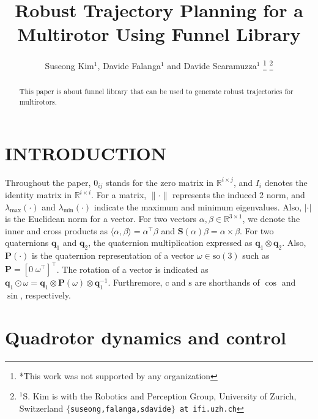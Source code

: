 \documentclass[letterpaper, 10 pt, conference]{ieeeconf}  %
\title{\LARGE \bf
Robust Trajectory Planning for a Multirotor Using Funnel Library
}
\author{Suseong Kim$^{1}$, Davide Falanga$^{1}$ and Davide Scaramuzza$^{1}$%
\thanks{*This work was not supported by any organization}%
\thanks{$^{1}$S. Kim is with the Robotics and Perception Group, University of Zurich, Switzerland
        {\tt\small $\{$suseong,falanga,sdavide$\}$ at ifi.uzh.ch}}%
}
\begin{document}
\maketitle
\thispagestyle{empty}
\pagestyle{empty}


\begin{abstract}

This paper is about funnel library that can be used to generate robust trajectories for multirotors.

\end{abstract}


\section{INTRODUCTION}

Throughout the paper, $0_{ij}$ stands for the zero matrix in $\mathbb{R}^{i\times j}$, and $I_i$ denotes the identity matrix in $\mathbb{R}^{i\times i}$. 
For a matrix, $\|\cdot\|$ represents the induced 2 norm, and $\lambda_{\max}(\cdot)$ and $\lambda_{\min}(\cdot)$ indicate the maximum and minimum eigenvalues.
Also, $|\cdot|$ is the Euclidean norm for a vector. 
For two vectors $\alpha,\beta \in \mathbb{R}^{3\times 1}$, 
we denote the inner and cross products as $\langle \alpha,\beta\rangle = \alpha^\top \beta$ and $\textbf{S}(\alpha)\beta = \alpha \times \beta$. 
For two quaternions $\mathbf{q}_1$ and $\mathbf{q}_2$, the quaternion multiplication expressed as $\mathbf{q}_1\otimes\mathbf{q}_2$. 
Also, $\textbf{P}(\cdot)$ is the quaternion representation of a vector $\omega\in\text{so}(3)$ such as $\textbf{P} = [0\;\omega^\top]^\top$. 
The rotation of a vector is indicated as $\mathbf{q}_1\odot\omega = \textbf{q}_1\otimes\textbf{P}(\omega)\otimes\textbf{q}_1^{-1}$. 
Furthremore, $\text{c}$ and $\text{s}$ are shorthands of $\cos$ and $\sin$, respectively.

\section{Quadrotor dynamics and control}
\end{document}
